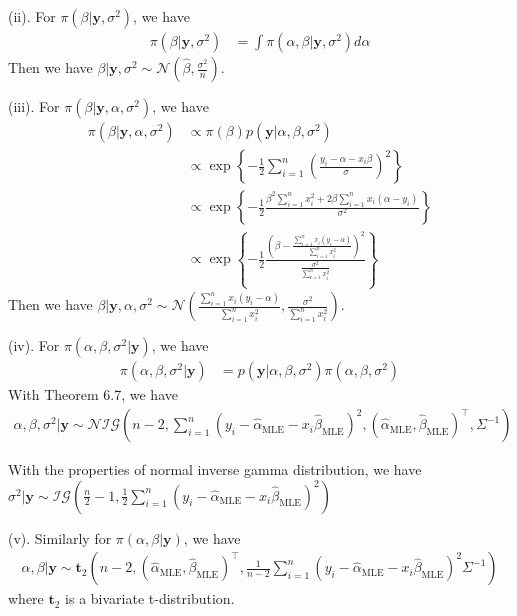 (ii). For $\pi(\beta \vert \bm{y}, \sigma^2)$, we have
\begin{align*}
    \pi(\beta \vert \bm{y}, \sigma^2)
    &= \int \pi(\alpha, \beta \vert \bm{y}, \sigma^2) d\alpha
\end{align*}
Then we have $\beta \vert \bm{y}, \sigma^2 \sim \mathcal{N}(\hat{\beta}, \frac{\sigma^2}{n})$.

(iii). For $\pi(\beta \vert \bm{y}, \alpha, \sigma^2)$, we have
\begin{align*}
    \pi(\beta \vert \bm{y}, \alpha, \sigma^2)
    &\propto \pi(\beta) p(\bm{y} \vert \alpha, \beta, \sigma^2)\\
    &\propto \exp \left\{-\frac{1}{2} \sum_{i=1}^{n}\left( \frac{y_i - \alpha - x_i \beta }{\sigma} \right)^2 \right\}\\
    &\propto \exp \left\{
        -\frac{1}{2} \frac{\beta^2 \sum_{i=1}^n x_i^2 + 2\beta\sum_{i=1}^n x_i(\alpha-y_i)}{\sigma^2}
        \right\}\\
    &\propto \exp \left\{
        -\frac{1}{2} \frac{( \beta - \frac{\sum_{i=1}^n x_i(y_i-\alpha)}{\sum_{i=1}^n x_i^2})^2}{\frac{\sigma^2}{\sum_{i=1}^n x_i^2}}
        \right\}
\end{align*}
Then we have $\beta \vert \bm{y}, \alpha, \sigma^2 \sim \mathcal{N}(\frac{\sum_{i=1}^n x_i(y_i-\alpha)}{\sum_{i=1}^n x_i^2}, \frac{\sigma^2}{\sum_{i=1}^n x_i^2})$.

(iv). For $\pi(\alpha, \beta, \sigma^2 \vert \bm{y})$, we have
\begin{align*}
    \pi(\alpha, \beta, \sigma^2 \vert \bm{y})
    &= p(\bm{y} \vert \alpha, \beta, \sigma^2) \pi (\alpha, \beta, \sigma^2)
\end{align*}
With Theorem 6.7, we have
\begin{align*}
    \alpha, \beta, \sigma^2 \vert \bm{y} \sim \mathcal{NIG}(n-2, \sum_{i=1}^{n}\left( y_i - \hat{\alpha}_{\mathrm{MLE}} - x_i \hat{\beta}_{\mathrm{MLE}} \right)^2, (\hat{\alpha}_{\mathrm{MLE}}, \hat{\beta}_{\mathrm{MLE}})^{\top}, \Sigma^{-1})
\end{align*}

With the properties of normal inverse gamma distribution, we have $ \sigma^2 \vert \bm{y} \sim \mathcal{IG}\left( \frac{n}{2}-1, \frac{1}{2}\sum_{i=1}^{n}\left( y_i - \hat{\alpha}_{\mathrm{MLE}} - x_i \hat{\beta}_{\mathrm{MLE}} \right)^2 \right) $

(v). Similarly for $\pi(\alpha, \beta \vert \bm{y})$, we have
\begin{align*}
    \alpha, \beta \vert \bm{y} \sim \bm{t}_2 (n-2, (\hat{\alpha}_{\mathrm{MLE}}, \hat{\beta}_{\mathrm{MLE}})^{\top}, \frac{1}{n-2} \sum_{i=1}^{n}\left( y_i - \hat{\alpha}_{\mathrm{MLE}} - x_i \hat{\beta}_{\mathrm{MLE}} \right)^2 \Sigma^{-1})
\end{align*}
where $\bm{t}_2$ is a bivariate t-distribution. 